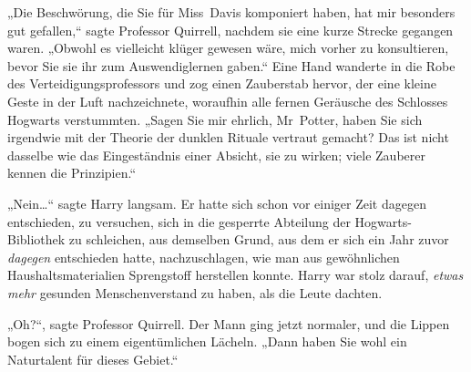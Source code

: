 „Die Beschwörung, die Sie für Miss~Davis komponiert haben, hat mir besonders gut gefallen,“ sagte Professor Quirrell, nachdem sie eine kurze Strecke gegangen waren. „Obwohl es vielleicht klüger gewesen wäre, mich vorher zu konsultieren, bevor Sie sie ihr zum Auswendiglernen gaben.“ Eine Hand wanderte in die Robe des Verteidigungsprofessors und zog einen Zauberstab hervor, der eine kleine Geste in der Luft nachzeichnete, woraufhin alle fernen Geräusche des Schlosses Hogwarts verstummten. „Sagen Sie mir ehrlich, Mr~Potter, haben Sie sich irgendwie mit der Theorie der dunklen Rituale vertraut gemacht? Das ist nicht dasselbe wie das Eingeständnis einer Absicht, sie zu wirken; viele Zauberer kennen die Prinzipien.“

„Nein…“ sagte Harry langsam. Er hatte sich schon vor einiger Zeit dagegen entschieden, zu versuchen, sich in die gesperrte Abteilung der Hogwarts-Bibliothek zu schleichen, aus demselben Grund, aus dem er sich ein Jahr zuvor \emph{dagegen} entschieden hatte, nachzuschlagen, wie man aus gewöhnlichen Haushaltsmaterialien Sprengstoff herstellen konnte. Harry war stolz darauf, \emph{etwas} \emph{mehr} gesunden Menschenverstand zu haben, als die Leute dachten.

„Oh?“, sagte Professor Quirrell. Der Mann ging jetzt normaler, und die Lippen bogen sich zu einem eigentümlichen Lächeln. „Dann haben Sie wohl ein Naturtalent für dieses Gebiet.“

